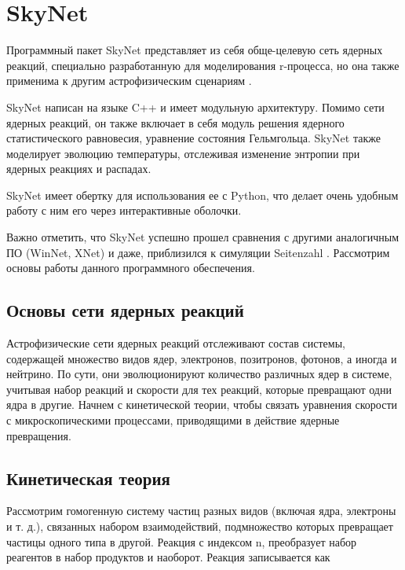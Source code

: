 \documentclass[14pt, a4paper]{article}
\numberwithin{figure}{section}
\numberwithin{equation}{section}
\begin{document}
\section{SkyNet}

Программный пакет SkyNet представляет из себя обще-целевую сеть ядерных реакций, специально разработанную для моделирования r-процесса, но она также применима к другим астрофизическим сценариям \cite{skynet}.

SkyNet написан на языке C++ и имеет модульную архитектуру. Помимо сети ядерных реакций, он также включает в себя модуль решения ядерного статистического равновесия, уравнение состояния Гельмгольца. SkyNet также моделирует эволюцию температуры, отслеживая изменение энтропии при ядерных реакциях и распадах.

SkyNet имеет обертку для использования ее с Python, что делает очень удобным работу с ним его через интерактивные оболочки.

Важно отметить, что SkyNet успешно прошел сравнения с другими аналогичным ПО (WinNet, XNet) и даже, приблизился к симуляции Seitenzahl \cite{simulation}. Рассмотрим основы работы данного программного обеспечения.

\subsection{Основы сети ядерных реакций}

Астрофизические сети ядерных реакций отслеживают состав системы, содержащей множество видов ядер, электронов, позитронов, фотонов, а иногда и нейтрино. По сути, они эволюционируют количество различных ядер в системе, учитывая набор реакций и скорости для тех реакций, которые превращают одни ядра в другие. Начнем с кинетической теории, чтобы связать уравнения скорости с микроскопическими процессами, приводящими в действие ядерные превращения.

\subsection{Кинетическая теория}

Рассмотрим гомогенную систему частиц разных видов (включая ядра, электроны и т. д.), связанных набором взаимодействий, подмножество которых превращает частицы одного типа в другой. Реакция с индексом n, преобразует набор реагентов в набор продуктов и наоборот. Реакция записывается как 
\end{document}
